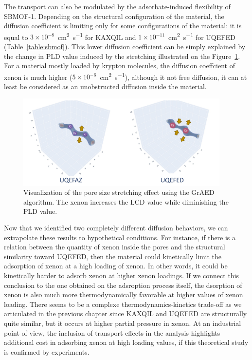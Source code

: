 \documentclass[main]{subfiles}
\begin{document}
The transport can also be modulated by the adsorbate-induced flexibility of SBMOF-1. Depending on the structural configuration of the material, the diffusion coefficient is limiting only for some configurations of the material: it is equal to $3\times10^{-8}$~\si{\square\cm\per\s} for KAXQIL and $1\times10^{-11}$~\si{\square\cm\per\s} for UQEFED (Table~\ref{table:sbmof}). This lower diffusion coefficient can be simply explained by the change in PLD value induced by the stretching illustrated on the Figure~\ref{fgr:stretch}. For a material mostly loaded by krypton molecules, the diffusion coeffcient of xenon is much higher ($5\times10^{-6}$~\si{\square\cm\per\s}), although it not free diffusion, it can at least be considered as an unobstructed diffusion inside the material. 

\begin{figure}[ht]
  \centering
  \includegraphics[width=0.95\textwidth]{figures/6-perspectives/KAXQIL_stretch.pdf}
  \caption{ Visualization of the pore size stretching effect using the GrAED algorithm. The xenon increases the LCD value while diminishing the PLD value. }\label{fgr:stretch}
\end{figure}

Now that we identified two completely different diffusion behaviors, we can extrapolate these results to hypothetical conditions. For instance, if there is a relation between the quantity of xenon inside the pores and the structural similarity toward UQEFED, then the material could kinetically limit the adsorption of xenon at a high loading of xenon. In other words, it could be kinetically harder to adsorb xenon at higher xenon loadings. If we connect this conclusion to the one obtained on the adsroption process itself, the dsorption of xenon is also much more thermodynamically favorable at higher values of xenon loading. There seems to be a complexe thermodynamics-kinetics trade-off as we articulated in the previous chapter since KAXQIL and UQEFED are structurally quite similar, but it occurs at higher partial pressure in xenon. At an industrial point of view, the inclusion of transport effects in the analysis highlights additional cost in adsorbing xenon at high loading values, if this theoretical study is confirmed by experiments.
\end{document}

